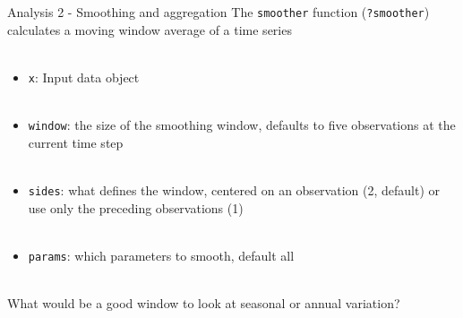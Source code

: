 \documentclass[xcolor=dvipsnames]{beamer}\usepackage[]{graphicx}\usepackage[]{color}
\begin{document}
\begin{frame}[containsverbatim]{Analysis 2 - Smoothing and aggregation}
The \texttt{smoother} function (\texttt{?smoother}) calculates a moving window average of a time series \\~\\
\begin{itemize}
\item \texttt{x}: Input data object \\~\\
\item \texttt{window}: the size of the smoothing window, defaults to five observations at the current time step \\~\\
\item \texttt{sides}: what defines the window, centered on an observation (2, default) or use only the preceding observations (1)  \\~\\
\item \texttt{params}: which parameters to smooth, default all \\~\\
\end{itemize}
What would be a good window to look at seasonal or annual variation?
\end{frame}
\end{document}
